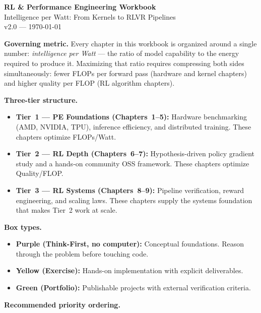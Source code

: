 \documentclass[10pt, letterpaper]{article}
\begin{document}
\begin{center}
  {\LARGE \textbf{RL \& Performance Engineering Workbook}}\\[4pt]
  {\large Intelligence per Watt: From Kernels to RLVR Pipelines}\\[6pt]
  {\small v2.0 --- \today}
\end{center}

\bigskip

\textbf{Governing metric.} Every chapter in this workbook is organized around a single number: \textit{intelligence per Watt} --- the ratio of model capability to the energy required to produce it. Maximizing that ratio requires compressing both sides simultaneously: fewer FLOPs per forward pass (hardware and kernel chapters) and higher quality per FLOP (RL algorithm chapters).

\textbf{Three-tier structure.}
\begin{itemize}
  \item \textbf{Tier~1 --- PE Foundations (Chapters~1--5):} Hardware benchmarking (AMD, NVIDIA, TPU), inference efficiency, and distributed training. These chapters optimize FLOPs/Watt.
  \item \textbf{Tier~2 --- RL Depth (Chapters~6--7):} Hypothesis-driven policy gradient study and a hands-on community OSS framework. These chapters optimize Quality/FLOP.
  \item \textbf{Tier~3 --- RL Systems (Chapters~8--9):} Pipeline verification, reward engineering, and scaling laws. These chapters supply the systems foundation that makes Tier~2 work at scale.
\end{itemize}

\textbf{Box types.}
\begin{itemize}
  \item \textbf{Purple (Think-First, no computer):} Conceptual foundations. Reason through the problem before touching code.
  \item \textbf{Yellow (Exercise):} Hands-on implementation with explicit deliverables.
  \item \textbf{Green (Portfolio):} Publishable projects with external verification criteria.
\end{itemize}

\textbf{Recommended priority ordering.}
\end{document}
